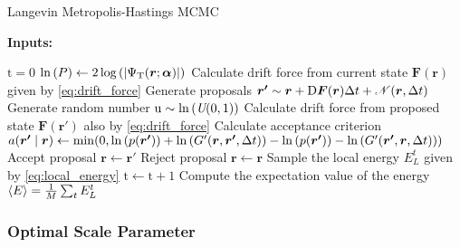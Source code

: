 \begin{algorithm}
\caption{Langevin Metropolis-Hastings MCMC}\label{algo:lmh}
\hspace*{\algorithmicindent} \textbf{Inputs: }
\begin{algorithmic}[1]
\State $\mathrm{t}=0$
\State $\ln{\qty(P)}\gets 2\log{\qty(\abs{\Psi_{\mathrm{T}}(\bm{r};\bm{\alpha})})}$ 
\Repeat 
    \State Calculate drift force from current state $\bm{F}(\bm{r})$ given by \autoref{eq:drift_force}
    \State Generate proposals $\bm{r'}\sim\bm{r}+\mathrm{D}\bm{F}(\bm{r})\Delta t + \mathcal{N}\qty(\bm{r},\Delta t)$
    \State Generate random number $\mathrm{u}\sim\ln{\qty(\textit{U}(0, 1))}$
    \State Calculate drift force from proposed state $\bm{F}(\bm{r'})$ also by \autoref{eq:drift_force}
    \State Calculate acceptance criterion
    \State $a\qty(\bm{r'}\mid\bm{r})\gets\mathrm{min}\qty(0, \ln{\qty(p\qty(\bm{r'}))} + \ln{\qty(G'\qty(\bm{r}, \bm{r'}, \Delta t))} - \ln{\qty(p\qty(\bm{r'}))}-\ln{\qty(G'\qty(\bm{r'}, \bm{r}, \Delta t))})$
        \State Accept proposal $\bm{r}\gets\bm{r'}$
    \Else
        \State Reject proposal $\bm{r}\gets\bm{r}$
    \EndIf
    \State Sample the local energy $E^t_L$ given by \autoref{eq:local_energy}
    \State $\mathrm{t}\gets\mathrm{t}+1$
\State Compute the expectation value of the energy $\expval{E}=\frac{1}{M}\sum_t E^t_L$
\end{algorithmic}
\end{algorithm}

\subsubsection{Optimal Scale Parameter}\label{sec:tuning}


